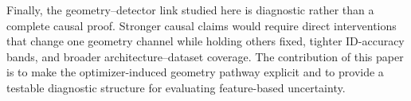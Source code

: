 Finally, the geometry--detector link studied here is diagnostic rather than a
complete causal proof. Stronger causal claims would require direct interventions
that change one geometry channel while holding others fixed, tighter ID-accuracy
bands, and broader architecture--dataset coverage. The contribution of this
paper is to make the optimizer-induced geometry pathway explicit and to provide a
testable diagnostic structure for evaluating feature-based uncertainty.
